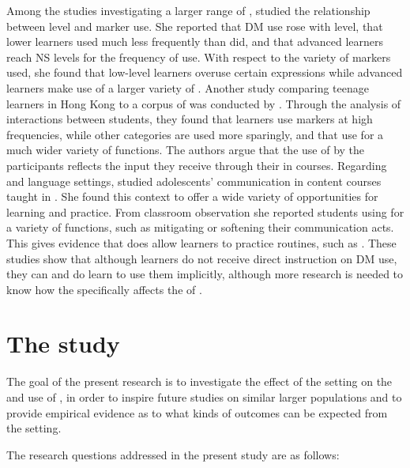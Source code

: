\documentclass[output=paper]{langsci/langscibook}
\begin{document}
Among the studies investigating a larger range of , \citet{Neary-Sundquist2014} studied the relationship between  level and  marker use. She reported that DM use rose with  level, that lower  learners used  much less frequently than  did, and that advanced learners reach NS levels for the frequency of use. With respect to the variety of markers used, she found that low-level learners overuse certain expressions while advanced learners make use of a larger variety of . Another study comparing teenage learners in Hong Kong to a corpus of   was conducted by \citet{FungCarter2007}. Through the analysis of interactions between students, they found that learners use  markers at high frequencies, while other categories are used more sparingly, and that  use  for a much wider variety of functions. The authors argue that the use of  by the participants reflects the input they receive through their  in  courses. Regarding  and language settings, \citet{Nikula2008} studied adolescents’ communication in content courses taught in . She found this context to offer a wide variety of opportunities for  learning and practice. From classroom observation she reported students using  for a variety of  functions, such as mitigating or softening their communication acts. This gives evidence that  does allow learners to practice  routines, such as . These studies show that although learners do not receive direct instruction on DM use, they can and do learn to use them implicitly, although more research is needed to know how the  specifically affects the  of .


\section{The study}

The goal of the present research is to investigate the effect of the  setting on the  and use of , in order to inspire future studies on similar larger populations and to provide empirical evidence as to what kinds of  outcomes can be expected from the  setting. 

The research questions addressed in the present study are as follows:
\end{document}
